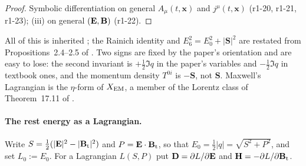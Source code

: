 \begin{proof}
Symbolic differentiation on general $A_\mu(t,\mathbf x)$ and $j^\mu(t,\mathbf x)$ (r1-20, r1-21, r1-23); (iii) on general $(\mathbf E,\mathbf B)$ (r1-22).
\end{proof}

All of this is inherited \cite{Jackson,LandauLifshitz2,Rainich1925}; the Rainich identity and $E_6^2=E_0^2+|\mathbf S|^2$ are restated from
Propositions~2.4--2.5 of \cite{RE}. Two signs are fixed by the paper's orientation and are easy to lose: the second invariant is
$+\tfrac12\Im q$ in the paper's variables and $-\tfrac12\Im q$ in textbook ones, and the momentum density $T^{0i}$ is $-\mathbf S$, not
$\mathbf S$. Maxwell's Lagrangian is the $\eta$-form of $X_{\rm EM}$, a member of the Lorentz class of Theorem~17.11 of \cite{ES17}.

\paragraph{The rest energy as a Lagrangian.}
Write $S=\tfrac12(|\mathbf E|^2-|\mathbf B_{\rm t}|^2)$ and $P=\mathbf E\cdot\mathbf B_{\rm t}$, so that $E_0=\tfrac12|q|=\sqrt{S^2+P^2}$, and set $L_0:=E_0$.
For a Lagrangian $L(S,P)$ put $\mathbf D=\partial L/\partial\mathbf E$ and $\mathbf H=-\partial L/\partial\mathbf B_{\rm t}$.

